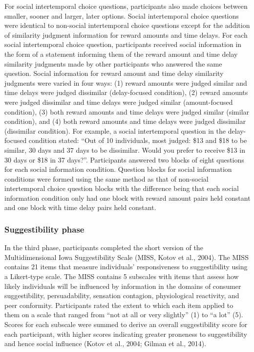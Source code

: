 \documentclass[
  pub,floatsintext]{apa6}
\begin{document}
For social intertemporal choice questions, participants also made choices between smaller, sooner and larger, later options. Social intertemporal choice questions were identical to non-social intertemporal choice questions except for the addition of similarity judgment information for reward amounts and time delays. For each social intertemporal choice question, participants received social information in the form of a statement informing them of the reward amount and time delay similarity judgments made by other participants who answered the same question. Social information for reward amount and time delay similarity judgments were varied in four ways: (1) reward amounts were judged similar and time delays were judged dissimilar (delay-focused condition), (2) reward amounts were judged dissimilar and time delays were judged similar (amount-focused condition), (3) both reward amounts and time delays were judged similar (similar condition), and (4) both reward amounts and time delays were judged dissimilar (dissimilar condition). For example, a social intertemporal question in the delay-focused condition stated: ``Out of 10 individuals, most judged: \$13 and \$18 to be similar, 30 days and 37 days to be dissimilar. Would you prefer to receive \$13 in 30 days or \$18 in 37 days?''. Participants answered two blocks of eight questions for each social information condition. Question blocks for social information conditions were formed using the same method as that of non-social intertemporal choice question blocks with the difference being that each social information condition only had one block with reward amount pairs held constant and one block with time delay pairs held constant.

\hypertarget{suggestibility-phase}{%
\subsubsection{Suggestibility phase}\label{suggestibility-phase}}

In the third phase, participants completed the short version of the Multidimensional Iowa Suggestibility Scale (MISS, Kotov et al., 2004). The MISS contains 21 items that measure individuals' responsiveness to suggestibility using a Likert-type scale. The MISS contains 5 subscales with items that assess how likely individuals will be influenced by information in the domains of consumer suggestibility, persuadability, sensation contagion, physiological reactivity, and peer conformity. Participants rated the extent to which each item applied to them on a scale that ranged from ``not at all or very slightly'' (1) to ``a lot'' (5). Scores for each subscale were summed to derive an overall suggestibility score for each participant, with higher scores indicating greater proneness to suggestibility and hence social influence (Kotov et al., 2004; Gilman et al., 2014).
\end{document}
